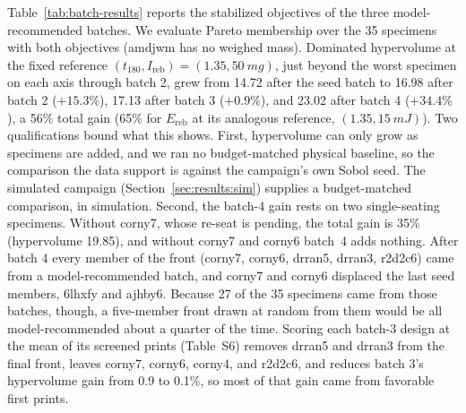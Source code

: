 \documentclass[11pt]{article}
\begin{document}
Table~\ref{tab:batch-results} reports the stabilized objectives of the
three model-recommended batches. We evaluate Pareto membership over the
35 specimens with both objectives (amdjwm has no weighed mass).
Dominated hypervolume at the fixed reference
$(t_{180}, I_{\mathrm{reb}}) = (1.35, \SI{50}{mg})$, just beyond the
worst specimen on each axis through batch 2, grew from 14.72 after the
seed batch to 16.98 after batch 2 ($+15.3\%$), 17.13 after batch 3
($+0.9\%$), and 23.02 after batch 4 ($+34.4\%$), a 56\% total gain (65\%
for $E_{\mathrm{reb}}$ at its analogous reference, $(1.35, \SI{15}{mJ})$).
Two qualifications bound what this shows. First, hypervolume can only
grow as specimens are added, and we ran no budget-matched physical
baseline, so the comparison the data support is against the campaign's
own Sobol seed. The simulated campaign (Section~\ref{sec:results:sim})
supplies a budget-matched comparison, in simulation. Second, the batch-4 gain rests on two
single-seating specimens. Without corny7, whose re-seat is pending, the
total gain is 35\% (hypervolume 19.85), and without corny7 and corny6
batch~4 adds nothing. After batch 4 every member of the front (corny7,
corny6, drran5, drran3, r2d2c6) came from a model-recommended batch, and
corny7 and corny6 displaced the last seed members, 6lhxfy and ajhby6.
Because 27 of the 35 specimens came from those batches, though, a
five-member front drawn at random from them would be all
model-recommended about a quarter of the time. Scoring each batch-3
design at the mean of its screened prints
(Table~S6) removes drran5 and drran3
from the final front, leaves corny7, corny6, corny4, and r2d2c6, and
reduces batch 3's hypervolume gain from 0.9 to 0.1\%, so most of that
gain came from favorable first prints.
\end{document}
